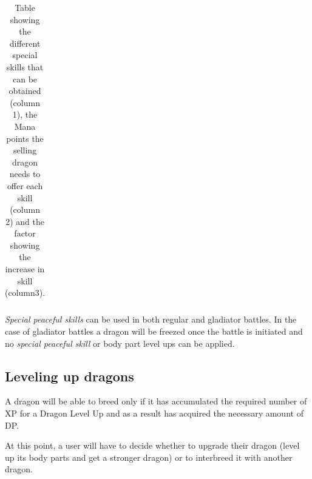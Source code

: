 \documentclass[12pt]{article}
\begin{document}
{\begin{table}[H]
\begin{tabular}{p{1.49in}p{1.92in}p{2.62in}}
\end{tabular}\caption{Table showing the different special skills that can be obtained (column 1), the Mana points the selling dragon needs to offer each skill (column 2) and the factor showing the increase in skill (column3).}
\label{tab:Table showing the different special skills that can be obtained (column 1), the Mana points the selling dragon needs to offer each skill (column 2) and the factor showing the increase in skill (column3).}

 \end{table}


\textit{Special peaceful skills} can be used in both regular and gladiator battles. In the case of gladiator battles a dragon will be freezed once the battle is initiated and no \textit{special  peaceful skill} or body part level ups can be applied.\par

\setlength{\parskip}{9.96pt}
\subsection{Leveling up dragons}
 \label{Leveling up dragons}   \par

A dragon will be able to breed only if it has accumulated the required number of XP for a Dragon Level Up and as a result has acquired the necessary amount of DP.\par

At this point, a user will have to decide whether to upgrade their dragon (level up its body parts and get a stronger dragon) or to interbreed it with another dragon.\par

}
\end{document}

